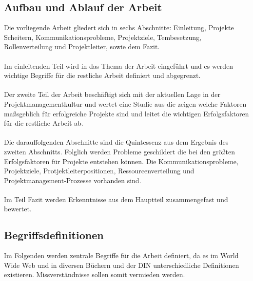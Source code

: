 \documentclass[11pt]{scrartcl}
\begin{document}
\subsection{Aufbau und Ablauf der Arbeit}
Die vorliegende Arbeit gliedert sich in sechs Abschnitte: Einleitung, Projekte Scheitern, Kommunikationsprobleme, Projektziele, Tembesetzung, Rollenverteilung und Projektleiter, sowie dem Fazit.\\
\\
Im einleitenden Teil wird in das Thema der Arbeit eingeführt und es werden wichtige Begriffe für die restliche Arbeit definiert und abgegrenzt.  
\\ \\
Der zweite Teil der Arbeit beschäftigt sich mit der aktuellen Lage in der Projektmanagementkultur und wertet eine Studie aus die zeigen welche Faktoren maßsgeblich für erfolgreiche Projekte sind und leitet die wichtigen Erfolgsfaktoren für die restliche Arbeit ab. 
\\ \\
Die darauffolgenden Abschnitte sind die Quintessenz aus dem Ergebnis des zweiten Abschnitts. Folglich werden Probleme geschildert die bei den größten Erfolgsfaktoren für Projekte entstehen können. Die Kommunikationsprobleme, Projektziele, Protjektleiterpositionen, Ressourcenverteilung und Projektmanagement-Prozesse vorhanden sind. 
\\ \\
Im Teil Fazit werden Erkenntnisse aus dem Hauptteil zusammengefast und bewertet.

\subsection{Begriffsdefinitionen}

Im Folgenden werden zentrale Begriffe für die Arbeit definiert, da es im World Wide Web und in diversen Büchern und der DIN unterschiedliche Definitionen existieren. Missverständnisse sollen somit vermieden werden.
\end{document}
